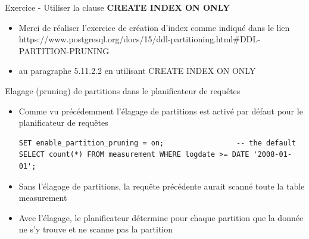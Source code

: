\begin{frame}[fragile]{Exercice - Utiliser la clause \textbf{CREATE INDEX ON ONLY}}

   \begin{itemize}
      \item Merci de réaliser l'exercice de création d'index comme indiqué dans le lien https://www.postgresql.org/docs/15/ddl-partitioning.html\#DDL-PARTITION-PRUNING
      \item au paragraphe 5.11.2.2 en utilisant CREATE INDEX ON ONLY
   \end{itemize}

\end{frame}


\begin{frame}[fragile]{Elagage (pruning) de partitions dans le planificateur de requêtes}

   \begin{itemize}
      \item Comme vu précédemment l'élagage de partitions est activé par défaut pour le planificateur de requêtes
\begin{tiny}
\begin{Verbatim}[commandchars=\\\{\}]
SET enable_partition_pruning = on;                 -- the default
SELECT count(*) FROM measurement WHERE logdate >= DATE '2008-01-01';
\end{Verbatim}
\end{tiny}
      \item Sans l'élagage de partitions, la requête précédente aurait scanné toute la table measurement
      \item Avec l'élagage, le planificateur détermine pour chaque partition que la donnée ne s'y trouve et ne scanne pas la partition
   \end{itemize}

\end{frame}


